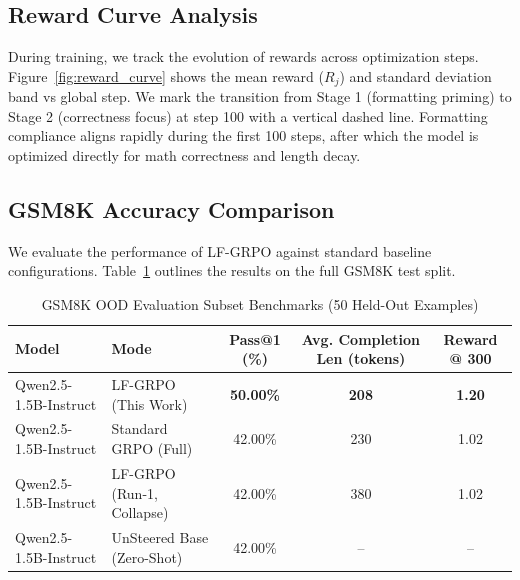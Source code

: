 \documentclass[11pt]{article}
\newcommand{\brandfig}[1]{#1_brand}
\newcommand{\brandfig}[1]{#1}
\begin{document}
\subsection{Reward Curve Analysis}
During training, we track the evolution of rewards across optimization steps. Figure~\ref{fig:reward_curve} shows the mean reward ($R_j$) and standard deviation band vs global step. We mark the transition from Stage 1 (formatting priming) to Stage 2 (correctness focus) at step 100 with a vertical dashed line. Formatting compliance aligns rapidly during the first 100 steps, after which the model is optimized directly for math correctness and length decay.


\subsection{GSM8K Accuracy Comparison}
We evaluate the performance of LF-GRPO against standard baseline configurations. Table~\ref{tab:comparison_results} outlines the results on the full GSM8K test split.

\begin{table}[h]
\centering
\caption{GSM8K OOD Evaluation Subset Benchmarks (50 Held-Out Examples)}
\label{tab:comparison_results}
\begin{tabular}{llccc}
\toprule
\textbf{Model} & \textbf{Mode} & \textbf{Pass@1 (\%)} & \textbf{Avg. Completion Len (tokens)} & \textbf{Reward @ 300} \\
\midrule
Qwen2.5-1.5B-Instruct & LF-GRPO (This Work) & \textbf{50.00\%} & \textbf{208} & \textbf{1.20} \\
Qwen2.5-1.5B-Instruct & Standard GRPO (Full) & 42.00\% & 230 & 1.02 \\
Qwen2.5-1.5B-Instruct & LF-GRPO (Run-1, Collapse) & 42.00\% & 380 & 1.02 \\
Qwen2.5-1.5B-Instruct & UnSteered Base (Zero-Shot) & 42.00\% & -- & -- \\
\bottomrule
\end{tabular}
\end{table}
\end{document}
